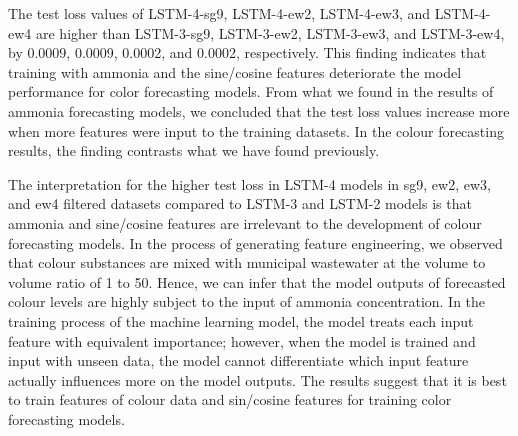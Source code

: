The test loss values of LSTM-4-sg9, LSTM-4-ew2, LSTM-4-ew3, and LSTM-4-ew4 are higher than LSTM-3-sg9, LSTM-3-ew2, LSTM-3-ew3, and LSTM-3-ew4, by 0.0009, 0.0009, 0.0002, and 0.0002, respectively. This finding indicates that training with ammonia and the sine/cosine features deteriorate the model performance for color forecasting models. From what we found in the results of ammonia forecasting models, we concluded that the test loss values increase more when more features were input to the training datasets. In the colour forecasting results, the finding contrasts what we have found previously. 

The interpretation for the higher test loss in LSTM-4 models in sg9, ew2, ew3, and ew4 filtered datasets compared to LSTM-3 and LSTM-2 models is that ammonia and sine/cosine features are irrelevant to the development of colour forecasting models. In the process of generating feature engineering, we observed that colour substances are mixed with municipal wastewater at the volume to volume ratio of 1 to 50. Hence, we can infer that the model outputs of forecasted colour levels are highly subject to the input of ammonia concentration. In the training process of the machine learning model, the model treats each input feature with equivalent importance; however, when the model is trained and input with unseen data, the model cannot differentiate which input feature actually influences more on the model outputs. The results suggest that it is best to train features of colour data and sin/cosine features for training color forecasting models.


